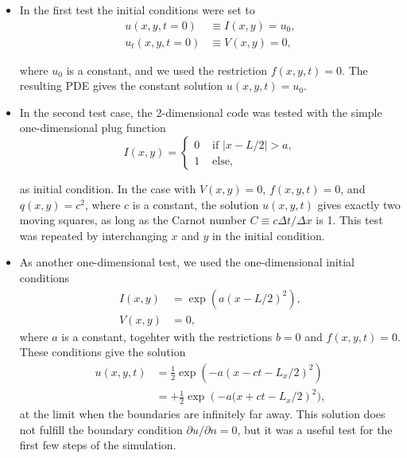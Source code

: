 \documentclass[twoside]{article}
\begin{document}
\begin{itemize}
\item In the first test the initial conditions were set to 
  \begin{align}
    u(x, y, t=0) & \equiv I(x, y) = u_{0}, \nonumber \\
    u_{t}(x, y, t=0) & \equiv V(x, y) = 0,
  \end{align}

  where $u_{0}$ is a constant, and we used the restriction $f(x, y, t) = 0$. The resulting PDE gives the constant solution $u(x, y, t) = u_{0}$.
\item In the second test case, the 2-dimensional code was tested with the simple one-dimensional plug function 
  \begin{displaymath}
  I(x, y) = \left\{ \begin{array}{ll}
    0 & \text{ if } |x - L/2| > a, \\
    1 & \text{ else, }
  \end{array} \right.
\end{displaymath}

as initial condition. In the case with $V(x, y) = 0$, $f(x, y, t) = 0$, and
$q(x, y) = c^{2}$, where $c$ is a constant, the solution $u(x, y, t)$ gives
exactly two moving squares, as long as the Carnot number $C \equiv c\Delta t/ \Delta x$ is 1. This test was repeated by interchanging $x$ and $y$ in the initial condition.

\item As another one-dimensional test, we used the one-dimensional initial conditions
  \begin{align}
    I(x, y) & = \exp\left(a(x - L/2)^{2}\right), \nonumber \\
    V(x, y) & = 0,  
  \end{align}
where $a$ is a constant, togehter with the restrictions $b = 0$ and $f(x, y, t) = 0$. These conditions give the solution
\begin{align}
  u(x, y, t) &= \frac{1}{2}\exp\left(-a(x-ct-L_{x}/2)^{2}\right) \nonumber \\
  & = + \frac{1}{2}\exp\left(-a(x + ct - L_{x}/2\right)^{2}),  
\end{align} 
at the limit when the boundaries are infinitely far away. This solution does not fulfill the boundary condition $\partial u/\partial n = 0$, but it was a useful test for the first few steps of the simulation.


\end{itemize}
\end{document}
